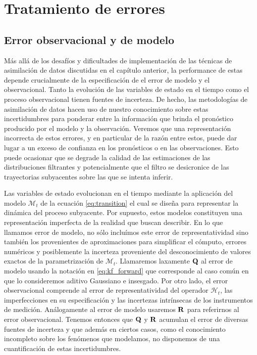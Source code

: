 \chapter{Tratamiento de errores}

\section{Error observacional y de modelo} \label{sec:model_obs_error}

Más allá de los desafíos y dificultades de implementación de las técnicas de asimilación de datos discutidas en el capítulo anterior, la performance de estas depende crucialmente de la especificación de el error de modelo y el observacional. Tanto la evolución de las variables de estado en el tiempo como el proceso observacional tienen fuentes de incerteza. De hecho, las metodologías de asimilación de datos hacen uso de nuestro conocimiento sobre estas incertidumbres para ponderar entre la información que brinda el pronóstico producido por el modelo y la observación. Veremos que una representación incorrecta de estos errores, y en particular de la razón entre estos, puede dar lugar a un exceso de confianza en los pronósticos o en las observaciones. Esto puede ocasionar que se degrade la calidad de las estimaciones de las distribuciones filtrantes y potencialmente que el filtro se desicronice de las trayectorias subyacentes sobre las que se intenta inferir.

Las variables de estado evolucionan en el tiempo mediante la aplicación del modelo $\mathcal{M}_t$ de la ecuación \ref{eq:transition} el cual se diseña para representar la dinámica del proceso subyacente. Por supuesto, estos modelos constituyen una representación imperfecta de la realidad que buscan describir. En lo que llamamos error de modelo, no sólo incluímos este error de representatividad sino también los provenientes de aproximaciones para simplificar el cómputo, errores numéricos y posiblemente la incerteza proveniente del desconocimiento de valores exactos de la parametrización de $\mathcal{M}_t$. Llamaremos laxamente $\mathbf{Q}$ al error de modelo usando la notación en \ref{eq:kf_forward} que corresponde al caso común en que lo consideremos aditivo Gaussiano e insesgado. Por otro lado, el error observacional comprende al error de representatividad del operador $\mathcal{H}_t$, las imperfecciones en su especificación y las incertezas intrínsecas de los instrumentos de medición. Análogamente al error de modelo usaremos $\mathbf{R}$ para referirnos al error observacional. Tenemos entonces que $\mathbf{Q}$ y $\mathbf{R}$ acumulan el error de diversas fuentes de incerteza y que además en ciertos casos, como el conocimiento incompleto sobre los fenómenos que modelamos, no disponemos de una cuantificación de estas incertidumbres.

